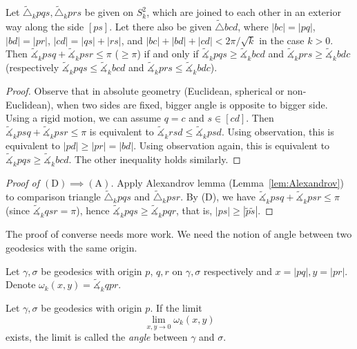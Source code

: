 \begin{lem}[Alexandrov]\label{lem:Alexandrov}
    Let $\tilde{\triangle}_kpqs,\tilde{\triangle}_kprs$ be given on $S^2_k$, which are joined to each other in an exterior way along the side $[ps]$.
    Let there also be given $\tilde{\triangle}bcd$, where $|bc|=|pq|$, $|bd|=|pr|$, $|cd|=|qs|+|rs|$, and $|bc|+|bd|+|cd|<2\pi/\sqrt{k}$ in the case $k>0$.
    Then $\tilde{\measuredangle}_kpsq+\tilde{\measuredangle}_kpsr\leq\pi$ ($\geq\pi$) if and only if $\tilde{\measuredangle}_kpqs\geq\tilde{\measuredangle}_kbcd$ and $\tilde{\measuredangle}_kprs\geq\tilde{\measuredangle}_kbdc$ (respectively $\tilde{\measuredangle}_kpqs\leq\tilde{\measuredangle}_kbcd$ and $\tilde{\measuredangle}_kprs\leq\tilde{\measuredangle}_kbdc$).
\end{lem}
\begin{proof}
    Observe that in absolute geometry (Euclidean, spherical or non-Euclidean), when two sides are fixed, bigger angle is opposite to bigger side.
    Using a rigid motion, we can assume $q=c$ and $s\in[cd]$.
    Then $\tilde{\measuredangle}_kpsq+\tilde{\measuredangle}_kpsr\leq\pi$ is equivalent to $\tilde{\measuredangle}_krsd\leq\tilde{\measuredangle}_kpsd$.
    Using observation, this is equivalent to $|pd|\geq|pr|=|bd|$.
    Using observation again, this is equivalent to $\tilde{\measuredangle}_kpqs\geq\tilde{\measuredangle}_kbcd$.
    The other inequality holds similarly.
\end{proof}

\begin{proof}[Proof of $\mathrm{(D)}\implies\mathrm{(A)}$]
    Apply Alexandrov lemma (Lemma~\ref{lem:Alexandrov}) to comparison triangle $\tilde{\triangle}_kpqs$ and $\tilde{\triangle}_kpsr$.
    By (D), we have $\tilde{\measuredangle}_kpsq+\tilde{\measuredangle}_kpsr\leq\pi$ (since $\tilde{\measuredangle}_kqsr=\pi$), hence $\tilde{\measuredangle}_kpqs\geq\tilde{\measuredangle}_kpqr$, that is, $|ps|\geq|\tilde{p}\tilde{s}|$.
\end{proof}

The proof of converse needs more work.
We need the notion of angle between two geodesics with the same origin.

\begin{nota}
    Let $\gamma,\sigma$ be geodesics with origin $p$, $q,r$ on $\gamma,\sigma$ respectively and $x=|pq|,y=|pr|$.
    Denote $\omega_k(x,y)=\tilde{\measuredangle}_kqpr$.
\end{nota}

\begin{defn}\label{defn:angle}
    Let $\gamma,\sigma$ be geodesics with origin $p$.
    If the limit
    \[\lim_{x,y\to 0}\omega_k(x,y)\]
    exists, the limit is called the \emph{angle} between $\gamma$ and $\sigma$.
\end{defn}

